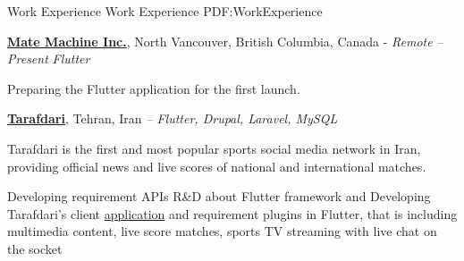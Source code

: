 \documentclass[letterpaper,MMMyyyy,nonstopmode]{simpleresumecv}
\begin{document}
\begin{Body}


\Section
{Work\newline
Experience}
{Work Experience}
{PDF:WorkExperience}

\Entry
\href{https://matemachine.com}
{\textbf{Mate Machine Inc.}},
\small{North Vancouver, British Columbia, Canada - }\textit{\small{Remote}}
\hfill
\textsl{\small{ -- Present}}
\Gap
\small{\textit{Flutter}}

\BulletItem
Preparing the Flutter application for the first launch.

\BigGap
\Entry
\href{https://tarafdari.com}
{\textbf{Tarafdari}},
\small{Tehran, Iran}
\hfill
\textsl{\small{ -- }}
\Gap
\small{\textit{Flutter, Drupal, Laravel, MySQL}}

\BulletItem
Tarafdari is the first and most popular sports social media network
in Iran, providing official news and live scores of national and international matches.
\begin{Detail}
\SubBulletItem
Developing requirement APIs
\SubBulletItem
R\&D about Flutter framework and Developing Tarafdari's client
\href{https://play.google.com/store/apps/details?id=com.tarafdari.news}
{application}
and requirement plugins in Flutter, that is including multimedia content,
live score matches, sports TV streaming with live chat on the socket
\end{Detail}






\end{Body}
\end{document}
